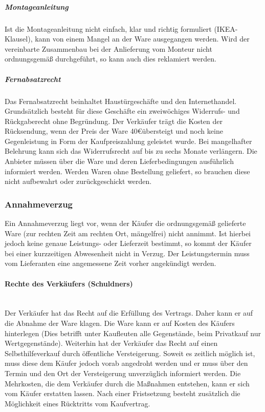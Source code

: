 \subparagraph{Montageanleitung} Ist die Montageanleitung nicht einfach, klar und richtig formuliert (IKEA-Klausel), kann von einem Mangel an der Ware ausgegangen werden. Wird der vereinbarte Zusammenbau bei der Anlieferung vom Monteur nicht ordnungsgemäß durchgeführt, so kann auch dies reklamiert werden.

\subparagraph{Fernabsatzrecht} Das Fernabsatzrecht beinhaltet Haustürgeschäfte und den Internethandel. Grundsätzlich besteht für diese Geschäfte ein zweiwöchiges Widerrufs- und Rückgaberecht ohne Begründung. Der Verkäufer trägt die Kosten der Rücksendung, wenn der Preis der Ware 40\euro übersteigt und noch keine Gegenleistung in Form der Kaufpreiszahlung geleistet wurde. Bei mangelhafter Belehrung kann sich das Widerrufsrecht auf bis zu sechs Monate verlängern. Die Anbieter müssen über die Ware und deren Lieferbedingungen ausführlich informiert werden. Werden Waren ohne Bestellung geliefert, so brauchen diese nicht aufbewahrt oder zurückgeschickt werden. 
		
		
\subsubsection{Annahmeverzug}

Ein Annahmeverzug liegt vor, wenn der Käufer die ordnungsgemäß gelieferte Ware (zur rechten Zeit am rechten Ort, mängelfrei) nicht annimmt. Ist hierbei jedoch keine genaue Leistungs- oder Lieferzeit bestimmt, so kommt der Käufer bei einer kurzzeitigen Abwesenheit nicht in Verzug. Der Leistungstermin muss vom Lieferanten eine angemessene Zeit vorher angekündigt werden.

\paragraph{Rechte des Verkäufers (Schuldners)}~\\
Der Verkäufer hat das Recht auf die Erfüllung des Vertrags. Daher kann er auf die Abnahme der Ware klagen. Die Ware kann er auf Kosten des Käufers hinterlegen (Dies betrifft unter Kaufleuten alle Gegenstände, beim Privatkauf nur Wertgegenstände). Weiterhin hat der Verkäufer das Recht auf einen Selbsthilfeverkauf durch öffentliche Versteigerung. Soweit es zeitlich möglich ist, muss diese dem Käufer jedoch vorab angedroht werden und er muss über den Termin und den Ort der Versteigerung unverzüglich informiert werden. Die Mehrkosten, die dem Verkäufer durch die Maßnahmen entstehen, kann er sich vom Käufer erstatten lassen. Nach einer Fristsetzung besteht zusätzlich die Möglichkeit eines Rücktritts vom Kaufvertrag.

